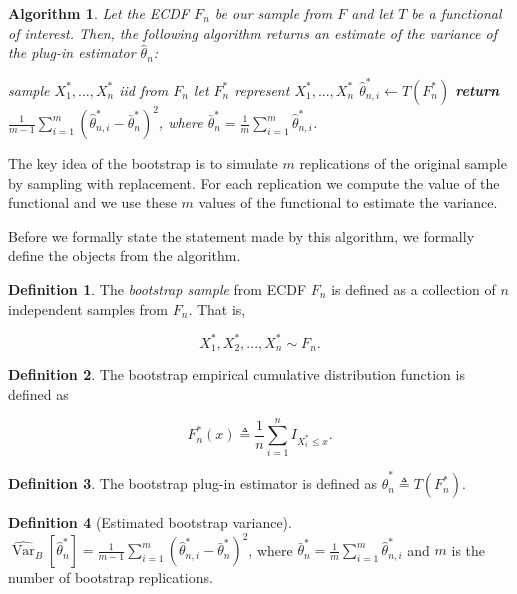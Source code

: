 \documentclass{book}
\theoremstyle{plain}%
\newtheorem{algo}{Algorithm}[section]
\theoremstyle{definition}
\newtheorem{definition}{Definition}[section]
\DeclareMathOperator{\Var}{Var}
\begin{document}
\begin{algo}
Let the ECDF $F_n$ be our sample from $F$ and let $T$ be a functional of interest. Then, the following algorithm returns an estimate of the variance of the plug-in estimator $\hat{\theta}_n$:
\begin{algorithmic}[1]
     
\State sample $X^*_{1},..., X^*_{n}$ iid from $F_n$ 
\State let $F^*_{n}$ represent $X^*_{1},..., X^*_{n}$
                \State $\hat{\theta}^*_{n,i} \gets T(F^*_{n})$
              \EndFor
              \State \textbf{return} $\frac{1}{m - 1} \sum_{i=1}^m \left(\hat{\theta}^*_{n,i} - \bar{\theta}^*_n\right)^2$, where $\bar{\theta}^*_n = \frac{1}{m} \sum_{i=1}^m \hat{\theta}^*_{n,i}$.
        \EndProcedure
    \end{algorithmic}\label{alg:bootstrap}
\end{algo}

The key idea of the bootstrap is to simulate $m$ replications of the original sample by sampling with replacement. For each replication we compute the value of the functional and we use these $m$ values of the functional to estimate the variance.

Before we formally state the statement made by this algorithm, we formally define the objects from the algorithm.

\begin{definition} The \textit{bootstrap sample} from ECDF $F_n$ is defined as a collection of $n$ independent samples from $F_n$. That is, 

$$X_1^*, X_2^*,...,X_n^* \sim F_n.$$ 
\end{definition}


\begin{definition} The bootstrap empirical cumulative distribution function is defined as

$$F^*_n(x) \triangleq \frac{1}{n}\sum_{i=1}^n I_{X^*_i \leq x}.$$
\end{definition}

\begin{definition}
The bootstrap plug-in estimator is defined as $\hat{\theta}^*_n \triangleq T(F^*_n)$.
\end{definition}

\begin{definition}[Estimated bootstrap variance]
$\widehat{\Var}_B[\hat{\theta}^*_n] = \frac{1}{m - 1} \sum_{i=1}^m \left(\hat{\theta}^*_{n,i} - \bar{\theta}^*_n\right)^2$, where $\bar{\theta}^*_n = \frac{1}{m} \sum_{i=1}^m \hat{\theta}^*_{n,i}$ and $m$ is the number of bootstrap replications.
\end{definition}
\end{document}
